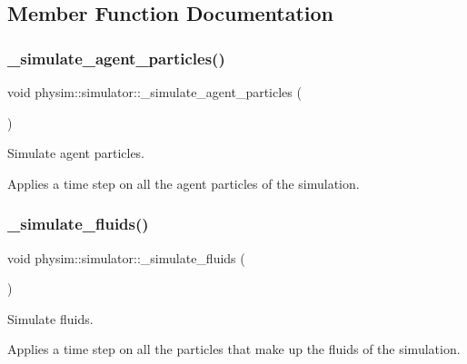 \subsection{Member Function Documentation}
\mbox{\label{classphysim_1_1simulator_a97eef0600da8870ee590babaffff775b}} 
\subsubsection{\texorpdfstring{\+\_\+simulate\+\_\+agent\+\_\+particles()}{\_simulate\_agent\_particles()}}
{\footnotesize\ttfamily void physim\+::simulator\+::\+\_\+simulate\+\_\+agent\+\_\+particles (\begin{DoxyParamCaption}{ }\end{DoxyParamCaption})\hspace{0.3cm}{\ttfamily [private]}}



Simulate agent particles. 

Applies a time step on all the agent particles of the simulation. \mbox{\label{classphysim_1_1simulator_ac01677745377a9520453b73e199fcf99}} 
\subsubsection{\texorpdfstring{\+\_\+simulate\+\_\+fluids()}{\_simulate\_fluids()}\hspace{0.1cm}{\footnotesize\ttfamily [1/2]}}
{\footnotesize\ttfamily void physim\+::simulator\+::\+\_\+simulate\+\_\+fluids (\begin{DoxyParamCaption}{ }\end{DoxyParamCaption})\hspace{0.3cm}{\ttfamily [private]}}



Simulate fluids. 

Applies a time step on all the particles that make up the fluids of the simulation.

